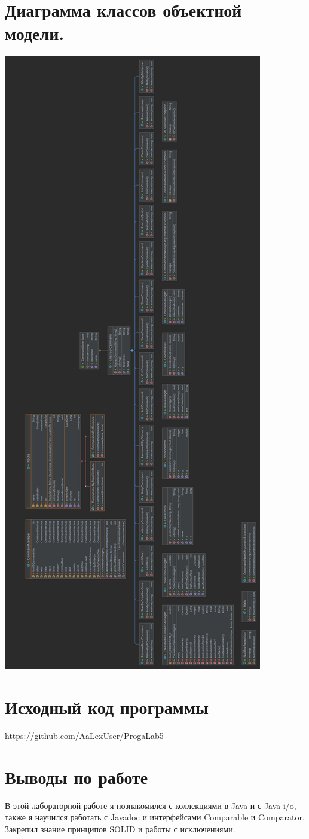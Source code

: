 \documentclass[12pt,onecolumn]{article}
\begin{document}
\section{Диаграмма классов объектной модели.}
\includegraphics[scale=0.1]{UML.png}
\section{Исходный код программы}
https://github.com/AaLexUser/ProgaLab5
\section{Выводы по работе}
В этой лабораторной работе я познакомился с коллекциями в Java и с Java i/o, 
также я научился работать с Javadoc и интерфейсами Comparable и Comparator. Закрепил знание принципов SOLID и работы с исключениями.
\end{document}
